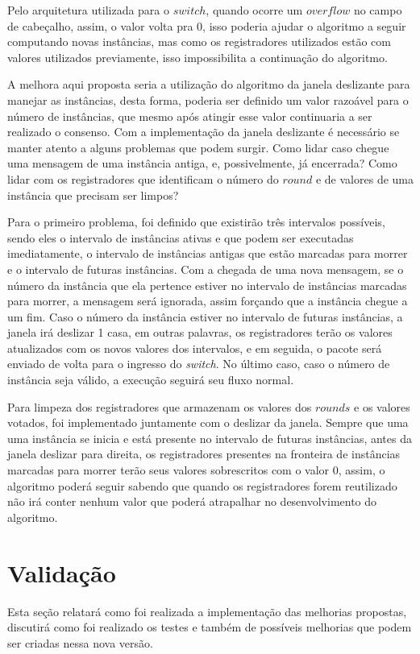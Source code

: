 \documentclass[
    12pt,
    openright, 
    oneside,
    a4paper,
    french,
    english,
    brazil
    ]{facom-ufu-abntex2}
\theoremstyle{definition}
\begin{document}
Pelo arquitetura utilizada para o $switch$, quando ocorre um $overflow$ no campo de cabeçalho, assim,
o valor volta pra 0, isso poderia ajudar o algoritmo a seguir computando novas instâncias, mas como
os registradores utilizados estão com valores utilizados previamente, isso impossibilita a continuação
do algoritmo.

A melhora aqui proposta seria a utilização do algoritmo da janela deslizante para manejar as instâncias,
desta forma, poderia ser definido um valor razoável para o número de instâncias, que mesmo após atingir
esse valor continuaria a ser realizado o consenso. Com a implementação da janela deslizante é necessário
se manter atento a alguns problemas que podem surgir. Como lidar caso chegue uma mensagem
de uma instância antiga, e, possivelmente, já encerrada? Como lidar com os registradores que identificam
o número do $round$ e de valores de uma instância que precisam ser limpos?

Para o primeiro problema, foi definido que existirão três intervalos possíveis, sendo eles o intervalo
de instâncias ativas e que podem ser executadas imediatamente, o intervalo de instâncias antigas que
estão marcadas para morrer e o intervalo de futuras instâncias. Com a chegada de uma nova mensagem, se o 
número da instância que ela pertence estiver no intervalo de instâncias marcadas para morrer, a mensagem
será ignorada, assim forçando que a instância chegue a um fim. Caso o número da instância estiver no
intervalo de futuras instâncias, a janela irá deslizar 1 casa, em outras palavras, os registradores terão
os valores atualizados com os novos valores dos intervalos, e em seguida, o pacote será enviado de volta 
para o ingresso do \textit{switch}. No último caso, caso o número de instância seja válido,
a execução seguirá seu fluxo normal.

Para limpeza dos registradores que armazenam os valores dos $rounds$ e os valores votados, foi implementado
juntamente com o deslizar da janela. Sempre que uma uma instância se inicia e está presente no intervalo de
futuras instâncias, antes da janela deslizar para direita, os registradores presentes na fronteira de 
instâncias marcadas para morrer terão seus valores sobrescritos com o valor 0, assim, o algoritmo poderá
seguir sabendo que quando os registradores forem reutilizado não irá conter nenhum valor que poderá atrapalhar
no desenvolvimento do algoritmo.

\section{Validação}
Esta seção relatará como foi realizada a implementação das melhorias propostas, discutirá como foi realizado
os testes e também de possíveis melhorias que podem ser criadas nessa nova versão.
\end{document}
